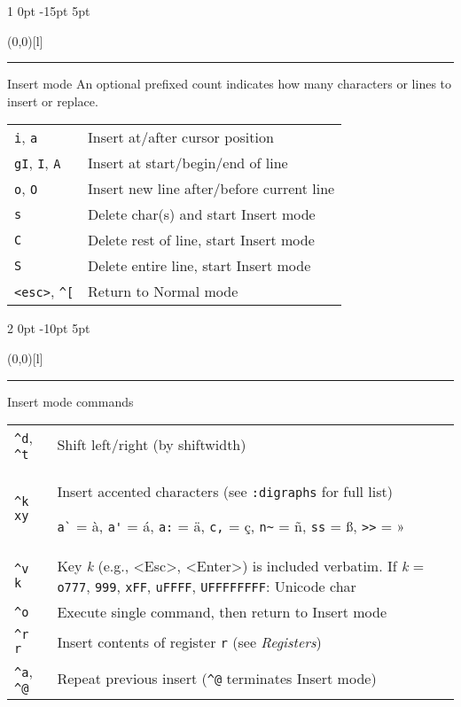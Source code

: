 \documentclass[a4paper, landscape, 10pt]{article}
\makeatletter
\newlength{\shift}
\renewcommand{\section}{%
    \@startsection{section}%
        {1}%
        {0pt}%
        {-15pt}%
        {5pt}%
        {\protect\makebox(0,0)[l]{\color{accentcolor!80}\rule[8pt]{\columnwidth}{19pt}}\hspace{.5em}\fontsize{14pt}{12pt}\selectfont\bfseries\color{white}}}
\renewcommand{\subsection}{%
    \@startsection{subsection}%
        {2}%
        {0pt}%
        {-10pt}%
        {5pt}%
        {\protect\makebox(0,0)[l]{\color{accentcolor!20}\rule[7pt]{\columnwidth}{19pt}}\hspace{.5em}\fontsize{12pt}{12pt}\selectfont\bfseries\itshape\color{accentcolor}}}
\newcommand{\V}[1]{\texttt{\textup{#1}}}
\makeatother
\begin{document}
\begin{multicols*}{3}
\section{Insert mode}
An optional prefixed count indicates how many characters or lines to insert or replace.
\vspace{.25\baselineskip}

    \begin{tabularx}{\columnwidth}{l>{\raggedright\arraybackslash}X}
\V{i}, \V{a}
        &Insert at/after cursor position\\
\V{gI}, \V{I}, \V{A}
        &Insert at start/begin/end of line\\
\V{o}, \V{O}
        &Insert new line after/before current line\\
\V{s}
        &Delete char(s) and start Insert mode\\
\V{C}
        &Delete rest of line, start Insert mode\\
\V{S}
        &Delete entire line, start Insert mode\\
\V{<esc>}, \verb|^[|
        &Return to Normal mode
    \end{tabularx}

\subsection{Insert mode commands}
    \begin{tabularx}{\columnwidth}{l>{\raggedright\arraybackslash}X}
\verb|^d|, \verb|^t|
        &Shift left/right (by shiftwidth)\\
\verb|^k xy|
        &Insert accented characters (see \V{:digraphs} for full list)

        \verb|a`| = à, \verb|a'| = á, \verb|a:| = ä, \verb|c,| = ç, \verb|n~| = ñ, \verb|ss| = ß, \V{>{}>} = »\\
\verb|^v k|
        &Key \textit{k} (e.g., <Esc>, <Enter>) is included verbatim.\linebreak
        If \textit{k} = \V{o777}, \V{999}, \V{xFF}, \V{uFFFF}, \V{UFFFFFFFF}: Unicode char\\
\verb|^o|
        &Execute single command, then return to Insert mode\\
\verb|^r r|
        &Insert contents of register \verb|r| (see \emph{Registers})\\
\verb|^a|, \verb|^@|
        &Repeat previous insert (\verb|^@| terminates Insert mode)
    \end{tabularx}




\end{multicols*}
\end{document}
